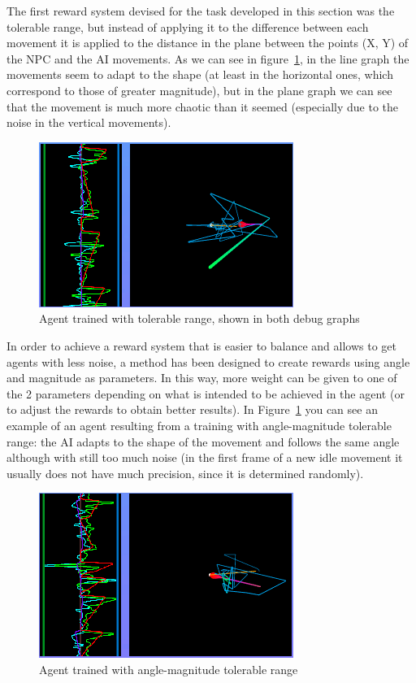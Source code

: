 The first reward system devised for the task developed in this section was the tolerable range, but instead of applying it to the difference between each movement it is applied to the distance in the plane between the points (X, Y) of the NPC and the AI movements. As we can see in figure~\ref{fig:axisTR}, in the line graph the movements seem to adapt to the shape (at least in the horizontal ones, which correspond to those of greater magnitude), but in the plane graph we can see that the movement is much more chaotic than it seemed (especially due to the noise in the vertical movements).

\begin{figure}[h]
  \centering
		\includegraphics[width=.8\textwidth]{img/axisTR.png}
  \caption{Agent trained with tolerable range, shown in both debug graphs}
  \label{fig:axisTR}
\end{figure}

In order to achieve a reward system that is easier to balance and allows to get agents with less noise, a method has been designed to create rewards using angle and magnitude as parameters. In this way, more weight can be given to one of the 2 parameters depending on what is intended to be achieved in the agent (or to adjust the rewards to obtain better results). In Figure~\ref{fig:axisTR} you can see an example of an agent resulting from a training with angle-magnitude tolerable range: the AI adapts to the shape of the movement and follows the same angle although with still too much noise (in the first frame of a new idle movement it usually does not have much precision, since it is determined randomly).

\begin{figure}[h]
  \centering
		\includegraphics[width=.8\textwidth]{img/axisAMTR.png}
  \caption{Agent trained with angle-magnitude tolerable range}
  \label{fig:axisAMTR}
\end{figure}

